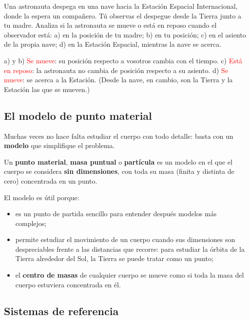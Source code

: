 \begin{exercise}
    Una astronauta despega en una nave hacia la Estación Espacial Internacional, donde la espera un compañero. Tú observas el
    despegue desde la Tierra junto a tu madre. Analiza si la astronauta se mueve o está en reposo cuando el observador está: a) en
    la posición de tu madre; b) en tu posición; c) en el asiento de la propia nave; d) en la Estación Espacial, mientras la nave
    se acerca.
    \begin{solu}
        a) y b) \textcolor{red}{Se mueve}: su posición respecto a vosotros cambia con el tiempo. c) \textcolor{red}{Está en reposo}:
        la astronauta no cambia de posición respecto a su asiento. d) \textcolor{red}{Se mueve}: se acerca a la Estación. (Desde la
        nave, en cambio, son la Tierra y la Estación las que se mueven.)
    \end{solu}
\end{exercise}

\subsection{El modelo de punto material}

Muchas veces no hace falta estudiar el cuerpo con todo detalle: basta con un \textbf{modelo} que simplifique el problema.

\begin{definition}
    Un \textbf{punto material}, \textbf{masa puntual} o \textbf{partícula} es un modelo en el que el cuerpo se considera
    \textbf{sin dimensiones}, con toda su masa (finita y distinta de cero) concentrada en un punto.
\end{definition}

El modelo es útil porque:
\begin{itemize}
    \item es un punto de partida sencillo para entender después modelos más complejos;
    \item permite estudiar el movimiento de un cuerpo cuando sus dimensiones son despreciables frente a las distancias que
    recorre: para estudiar la órbita de la Tierra alrededor del Sol, la Tierra se puede tratar como un punto;
    \item el \textbf{centro de masas} de cualquier cuerpo se mueve como si toda la masa del cuerpo estuviera concentrada en él.
\end{itemize}

\subsection{Sistemas de referencia}

